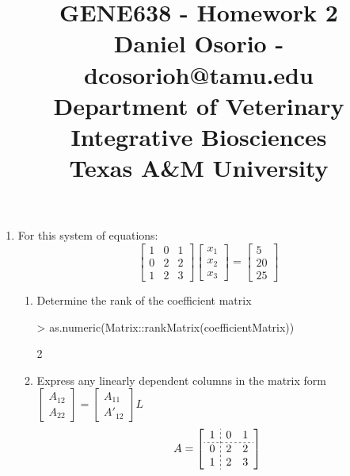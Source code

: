 \documentclass[12pt,a4paper]{paper}
\begin{document}
\title{GENE638 - Homework 2\\\small{Daniel Osorio - dcosorioh@tamu.edu\\Department of Veterinary Integrative Biosciences\\Texas A\&M University}}
\maketitle

\begin{enumerate}
\item For this system of equations:\[\left[\begin{array}{ccc}1 & 0 & 1 \\ 0 & 2 & 2 \\ 1 & 2 & 3\end{array}\right]\left[\begin{array}{c}x_{1} \\ x_{2} \\ x_{3}\end{array}\right]=\left[\begin{array}{c}5 \\ 20 \\ 25\end{array}\right]\]
\begin{enumerate}
\item Determine the rank of the coefficient matrix
\begin{Schunk}
\begin{Sinput}
> as.numeric(Matrix::rankMatrix(coefficientMatrix))
\end{Sinput}
\begin{Soutput}
[1] 2
\end{Soutput}
\end{Schunk}
\item Express any linearly dependent columns in the matrix form $\left[\begin{array}{c}A_{12}\\A_{22}\end{array}\right]=\left[\begin{array}{c}A_{11}\\A'_{12}\end{array}\right]L$
\begin{equation}
\begin{split}
A &= \left[\begin{array}{c;{2pt/2pt}cc}1 & 0 &1 \\\hdashline[2pt/2pt] 0 & 2 & 2 \\ 1 & 2 & 3\end{array}\right]\\

\end{split}
\end{equation}
\end{enumerate}
\end{enumerate}
\end{document}
